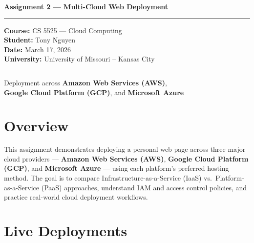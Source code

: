 \documentclass[12pt,letterpaper]{article}
\begin{document}
\begin{titlepage}
  \centering
  \vspace*{2cm}
  {\LARGE\bfseries Assignment 2 --- Multi-Cloud Web Deployment\par}
  \vspace{1cm}
  \rule{0.6\linewidth}{0.4pt}
  \vspace{1cm}

  {\large
    \textbf{Course:} CS 5525 --- Cloud Computing\\[6pt]
    \textbf{Student:} Tony Nguyen\\[6pt]
    \textbf{Date:} March 17, 2026\\[6pt]
    \textbf{University:} University of Missouri -- Kansas City
  }

  \vspace{2cm}
  \rule{0.6\linewidth}{0.4pt}
  \vspace{1cm}

  {\normalsize
    Deployment across \textbf{Amazon Web Services (AWS)},\\
    \textbf{Google Cloud Platform (GCP)}, and \textbf{Microsoft Azure}
  }
  \vfill
\end{titlepage}

\tableofcontents
\newpage

\section{Overview}

This assignment demonstrates deploying a personal web page across three major cloud
providers --- \textbf{Amazon Web Services (AWS)}, \textbf{Google Cloud Platform (GCP)},
and \textbf{Microsoft Azure} --- using each platform's preferred hosting method. The
goal is to compare Infrastructure-as-a-Service (IaaS) vs.\ Platform-as-a-Service (PaaS)
approaches, understand IAM and access control policies, and practice real-world cloud
deployment workflows.

\section{Live Deployments}
\end{document}

